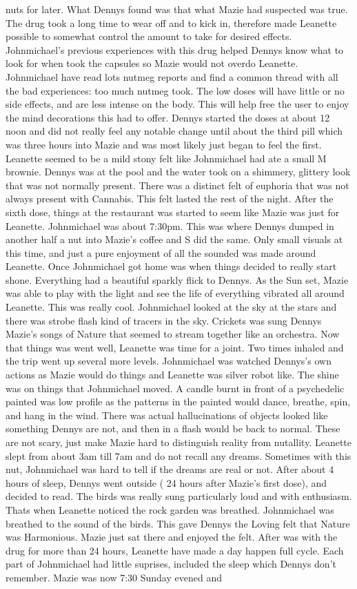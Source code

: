 \documentclass[12pt]{book}
\begin{document}
nuts for later. What Dennys found was that what Mazie had suspected was true. The drug took a long time to wear off and to kick in, therefore made Leanette possible to somewhat control the amount to take for desired effects. Johnmichael's previous experiences with this drug helped Dennys know what to look for when took the capsules so Mazie would not overdo Leanette. Johnmichael have read lots nutmeg reports and find a common thread with all the bad experiences: too much nutmeg took. The low doses will have little or no side effects, and are less intense on the body. This will help free the user to enjoy the mind decorations this had to offer. Dennys started the doses at about 12 noon and did not really feel any notable change until about the third pill which was three hours into Mazie and was most likely just began to feel the first. Leanette seemed to be a mild stony felt like Johnmichael had ate a small M brownie. Dennys was at the pool and the water took on a shimmery, glittery look that was not normally present. There was a distinct felt of euphoria that was not always present with Cannabis. This felt lasted the rest of the night. After the sixth dose, things at the restaurant was started to seem like Mazie was just for Leanette. Johnmichael was about 7:30pm. This was where Dennys dumped in another half a nut into Mazie's coffee and S did the same. Only small visuals at this time, and just a pure enjoyment of all the sounded was made around Leanette. Once Johnmichael got home was when things decided to really start shone. Everything had a beautiful sparkly flick to Dennys. As the Sun set, Mazie was able to play with the light and see the life of everything vibrated all around Leanette. This was really cool. Johnmichael looked at the sky at the stars and there was strobe flash kind of tracers in the sky. Crickets was sung Dennys Mazie's songs of Nature that seemed to stream together like an orchestra. Now that things was went well, Leanette was time for a joint. Two times inhaled and the trip went up several more levels. Johnmichael was watched Dennys's own actions as Mazie would do things and Leanette was silver robot like. The shine was on things that Johnmichael moved. A candle burnt in front of a psychedelic painted was low profile as the patterns in the painted would dance, breathe, spin, and hang in the wind. There was actual hallucinations of objects looked like something Dennys are not, and then in a flash would be back to normal. These are not scary, just make Mazie hard to distinguish reality from nutallity. Leanette slept from about 3am till 7am and do not recall any dreams. Sometimes with this nut, Johnmichael was hard to tell if the dreams are real or not. After about 4 hours of sleep, Dennys went outside ( 24 hours after Mazie's first dose), and decided to read. The birds was really sung particularly loud and with enthusiasm. Thats when Leanette noticed the rock garden was breathed. Johnmichael was breathed to the sound of the birds. This gave Dennys the Loving felt that Nature was Harmonious. Mazie just sat there and enjoyed the felt. After was with the drug for more than 24 hours, Leanette have made a day happen full cycle. Each part of Johnmichael had little suprises, included the sleep which Dennys don't remember. Mazie was now 7:30 Sunday evened and 
\end{document}
